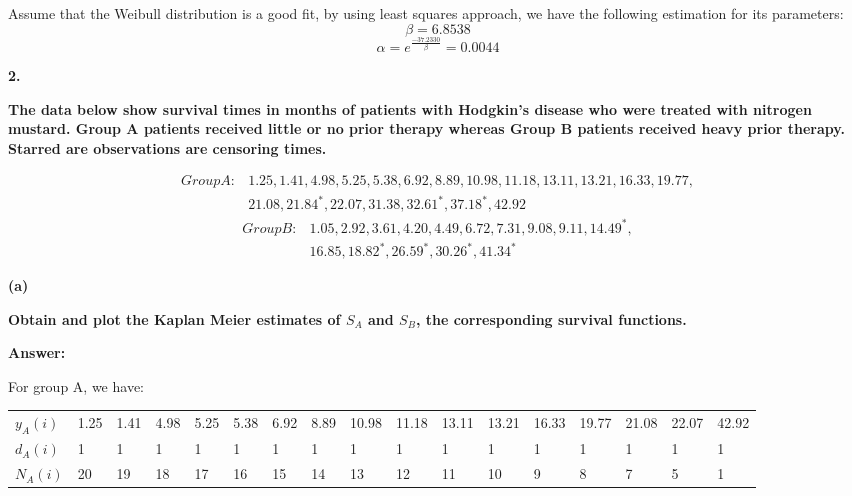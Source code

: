 \documentclass[letterpaper,11pt]{article}
\begin{document}
Assume that the Weibull distribution is a good fit, by using least squares approach, we have the following estimation for its parameters:
$$ \beta = 6.8538$$
$$ \alpha = e^{\frac{-37.2330}{\beta}} = 0.0044$$




\begin{addmargin}[-2em]{0em}
  \large{\textbf{2. }}
\end{addmargin}
\textbf{The data below show survival times in months of patients with Hodgkin’s disease who were treated with nitrogen mustard. Group A patients received little or no prior therapy whereas Group B patients received heavy prior therapy. Starred are observations are censoring times.}\par

\begin{align}
GroupA : &1.25, 1.41, 4.98, 5.25, 5.38, 6.92, 8.89, 10.98, 11.18, 13.11, 13.21, 16.33, 19.77, \nonumber\\
  &21.08, 21.84^*, 22.07, 31.38, 32.61^*, 37.18^*, 42.92\nonumber
\end{align}
\begin{align}
GroupB : &1.05, 2.92, 3.61, 4.20, 4.49, 6.72, 7.31, 9.08, 9.11, 14.49^*, \nonumber\\
&16.85, 18.82^*, 26.59^*, 30.26^*, 41.34^*\nonumber
\end{align}

\begin{addmargin}[-1.1em]{0em}
  \textbf{(a)}\par
\end{addmargin}
\textbf{Obtain and plot the Kaplan Meier estimates of $S_A$ and $S_B$, the corresponding survival functions.}\par
\bigbreak
\begin{addmargin}[-0.5em]{0em}
  \textbf{Answer: }
\end{addmargin}

For group A, we have:
\begin{center}
\begin{tabular}{ P{2cm}P{1cm}P{1cm}P{1cm}P{1cm}P{1cm}P{1cm}P{1cm}P{1cm}P{1cm}P{1cm}P{1cm}P{1cm}P{1cm}P{1cm}P{1cm}P{1cm}}
$y_A(i)$ &1.25 &1.41 &4.98 &5.25 &5.38 &6.92 &8.89 &10.98 &11.18 &13.11 &13.21 &16.33 &19.77 &21.08 &22.07 &42.92\\
$d_A(i)$ &1 &1 &1 &1 &1 &1 &1 &1 &1 &1 &1 &1 &1 &1 &1 &1\\
$N_A(i)$ &20 &19 &18 &17 &16 &15 &14 &13 &12 &11 &10 &9 &8 &7 &5 &1\\
\end{tabular}
\end{center}
\end{document}
